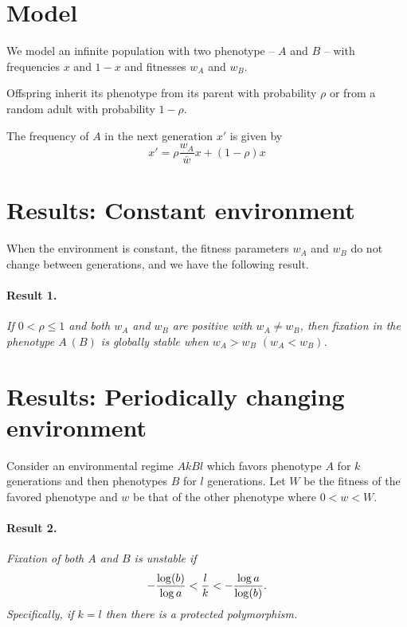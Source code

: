 \documentclass[a0,landscape]{a0poster}
\begin{document}
\begin{multicols}{4}
\color{DarkSlateGray} %

\section*{Model}

We model an infinite population with two phenotype -- $A$ and $B$ -- with frequencies $x$ and $1-x$ and fitnesses $w_A$ and $w_B$.

Offspring inherit its phenotype from its parent with probability $\rho$ or from a random adult with probability $1-\rho$.

The frequency of $A$ in the next generation $x'$ is given by
\begin{equation}
x' = \rho \frac{w_A}{\bar{w}}x + (1-\rho) x
\end{equation}


\section*{Results: Constant environment}

When the environment is constant, the fitness parameters $w_A$ and $w_B$ do not change between generations, and we have the following result.

\paragraph*{Result 1.} \textit{If $0<\rho\le 1$ and both $w_A$ and $w_B$ are positive with $w_A\ne w_B$, then fixation in the phenotype $A\ (B)$ is globally stable when $w_A>w_B$ $(w_A<w_B)$.}

\section*{Results: Periodically changing environment}

Consider an environmental regime $AkBl$ which favors phenotype $A$ for $k$ generations and then phenotypes $B$ for $l$ generations.
Let $W$ be the fitness of the favored phenotype and $w$ be that of the other phenotype where $0<w<W$.

\paragraph*{Result 2.}\textit{Fixation of both $A$ and $B$ is unstable if
\begin{equation}
-{\log(b)\over\log a} < {l \over k} < -{\log a\over\log(b)}.
\end{equation} 
Specifically, if $k=l$ then there is a protected polymorphism.}
  

\end{multicols}
\end{document}
